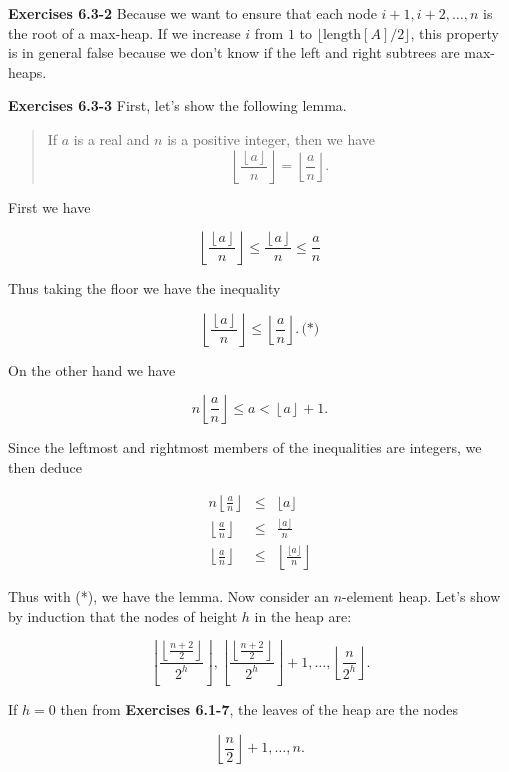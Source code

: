 \documentclass[a4paper,12pt]{article}
\newcommand{\newpar}[1]
{\bigskip \noindent \textbf{Exercises #1} \newline}
\begin{document}
\newpar{6.3-2}
Because we want to ensure that each node $i+1, i+2, \ldots, n$ is the
root of a max-heap.  If we increase $i$ from $1$ to $\lfloor
\mathrm{length}[A]/2\rfloor$, this property is in general false
because we don't know if the left and right subtrees are max-heaps.

\newpar{6.3-3}
First, let's show the following lemma.

\begin{quote}
  If $a$ is a real and $n$ is a positive integer, then we have
  \[ \left\lfloor \frac{\left\lfloor a \right\rfloor}{n}
  \right\rfloor =
  \left\lfloor \frac{a}{n}\right\rfloor.\]
\end{quote}

First we have

\[\left\lfloor \frac{\left\lfloor a \right\rfloor}{n}
\right\rfloor \le
\frac{\left\lfloor a \right\rfloor}{n} \le \frac{a}{n}\]

Thus taking the floor we have the inequality

\[ \left\lfloor \frac{\left\lfloor a \right\rfloor}{n}
\right\rfloor \le
\left\lfloor \frac{a}{n}\right\rfloor.\,\mbox{(*)}\]

On the other hand we have

\[  n \left\lfloor\frac{a}{n}\right\rfloor \le a <
\left\lfloor a \right\rfloor + 1.\]

Since the leftmost and rightmost members of the inequalities are
integers, we then deduce

\begin{eqnarray*}
n \left\lfloor \frac{a}{n} \right\rfloor &\le& \lfloor a \rfloor \\
\left\lfloor \frac{a}{n} \right\rfloor &\le& \frac{\lfloor a\rfloor}{n} \\
\left\lfloor \frac{a}{n}\right\rfloor &\le& \left\lfloor
\frac{\lfloor a \rfloor}{n} \right\rfloor
\end{eqnarray*}

Thus with (*), we have the lemma.
Now consider an $n$-element heap.  Let's show by induction that
the nodes of height $h$ in the heap are:

\[ \left\lfloor
\frac{\left\lfloor\frac{n+2}{2}\right\rfloor}{2^h}\right\rfloor,
\left\lfloor
\frac{\left\lfloor\frac{n+2}{2}\right\rfloor}{2^h}\right\rfloor + 1,
\ldots, \left\lfloor \frac{n}{2^h} \right\rfloor.\]

If $h = 0$ then from \textbf{Exercises 6.1-7}, the leaves of the heap
are the nodes

\[ \left\lfloor \frac{n}{2} \right\rfloor + 1, \ldots, n.\]
\end{document}
